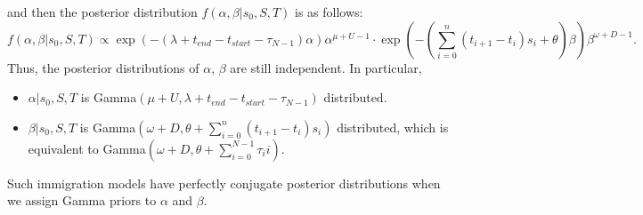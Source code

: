and then the posterior distribution $f(\alpha, \beta | s_0,S,T)$ is as follows:
$$ f(\alpha, \beta | s_0,S,T) \propto \exp(-(\lambda + t_{end} - t_{start}- \tau_{N - 1})\alpha) \alpha^{\mu + U -1} \cdot \exp(-(\sum_{i=0}^n (t_{i+1} - t_i)s_i + \theta)\beta) \beta^{\omega+ D -1}.$$
Thus, the posterior distributions of $\alpha$, $\beta$ are still independent. In
particular,
\begin{itemize}
\item $\alpha | s_0,S,T$ is Gamma$(\mu+ U,\lambda + t_{end} - t_{start}- \tau_{N - 1})$ distributed.\\
\item $\beta | s_0,S,T$ is Gamma$(\omega+ D,\theta + \sum_{i=0}^n (t_{i+1} - t_i)s_i)$ distributed, which is equivalent to Gamma$(\omega+ D,\theta +\sum_{i=0}^{N - 1} \tau_ii)$.\\
\end{itemize}
Such immigration models have perfectly conjugate posterior distributions when we 
assign Gamma priors to $\alpha$ and $\beta$. 
